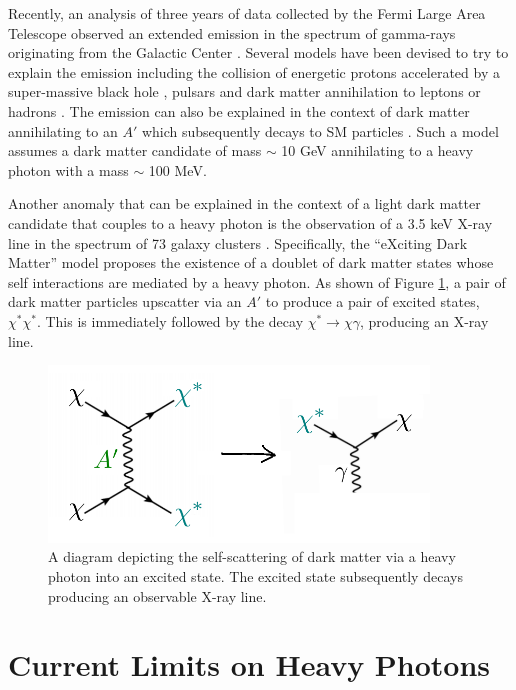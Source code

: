Recently, an analysis of three years of data collected by the Fermi Large Area
Telescope observed an extended emission in the spectrum of gamma-rays 
originating from the Galactic Center 
\cite{hooper2011, linden2011, abazajian2012, hooper2013}.  Several models have been 
devised to try to explain the emission including the collision of energetic 
protons accelerated by a super-massive black hole \cite{Hooper:2010mq}, 
pulsars \cite{Abazajian:2010zy} and dark matter annihilation to leptons or 
hadrons \cite{Hooper:2010mq, Goodenough:2009gk}.  The emission can also
be explained in the context of dark matter annihilating to an $A'$ which 
subsequently decays to SM particles \cite{Hooper:2012cw}.  Such a model assumes
a dark matter candidate of mass $\sim$ 10 GeV annihilating to a heavy photon
with a mass $\sim$ 100 MeV. 

Another anomaly that can be explained in the context of a light dark matter
candidate that couples to a heavy photon is the observation
of a 3.5 keV X-ray line in the spectrum of 73 galaxy clusters \cite{Bulbul:2014sua}.  
Specifically, the ``eXciting Dark Matter'' model \cite{Finkbeiner:2014sja} 
proposes the existence of a doublet of dark matter states whose self interactions are 
mediated by a heavy photon. As shown of Figure \ref{fig:dm_self_scat}, a pair
of dark matter particles upscatter via an $A'$ to produce a pair of excited states, 
$\chi^*\chi^*$. This is immediately followed by the decay 
$\chi^* \rightarrow  \chi\gamma$, producing an X-ray line.
\begin{figure}[t]
    \centering
    \includegraphics[width=0.9\textwidth]{images/xdm.png}
    \caption{A diagram depicting the self-scattering of dark matter via a heavy
             photon into an excited state. The excited state subsequently decays
             producing an observable X-ray line.}
    \label{fig:dm_self_scat}
\end{figure}


\section{Current Limits on Heavy Photons} \label{sec:current_limits}

